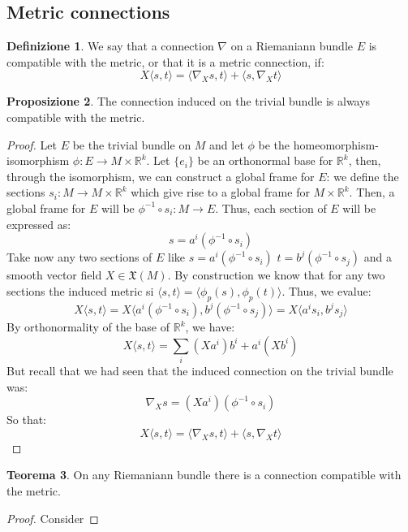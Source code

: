 \documentclass[12pt,a4paper]{report}
\theoremstyle{definition}
\newtheorem{Def}{Definizione}[chapter]
\theoremstyle{Theorem}
\newtheorem{Theo}[Def]{Teorema}
\newtheorem{Prop}[Def]{Proposizione}
\theoremstyle{definition}
\theoremstyle{definition}
\theoremstyle{definition}
\begin{document}
	\subsection{Metric connections}
	\begin{Def}
		We say that a connection $\nabla$ on a Riemaniann bundle $E$ is compatible with the metric, or that it is a metric connection, if:
		$$X\langle s,t\rangle =\langle \nabla_X s,t\rangle+\langle s,\nabla_X t\rangle$$
	\end{Def}
	\begin{Prop}
		The connection induced on the trivial bundle is always compatible with the metric.
	\end{Prop}
	\begin{proof}
		Let $E$ be the trivial bundle on $M$ and let $\phi$ be the homeomorphism-isomorphism $\phi:E\rightarrow M\times \mathbb{R}^k$.
		Let $\{e_i\}$ be an orthonormal base for $\mathbb{R}^k$, then, through the isomorphism, we can construct a global frame for $E$: we define the sections $s_i:M\rightarrow M\times \mathbb{R}^k$ which give rise to a global frame for $M\times \mathbb{R}^k$. Then, a global frame for $E$ will be $\phi^{-1}\circ s_i:M\rightarrow E$.
		Thus, each section of $E$ will be expressed as: 
		$$s=a^i(\phi^{-1}\circ s_i)$$
		Take now any two sections of $E$ like $s=a^i(\phi^{-1}\circ s_i)$ $t=b^j(\phi^{-1}\circ s_j)$ and a smooth vector field $X\in\mathfrak{X}(M)$. By construction we know that for any two sections the induced metric si $\langle s,t\rangle=\langle \phi_p(s),\phi_p(t)\rangle$. Thus, we evalue:
		$$X\langle s,t\rangle=X\langle a^i(\phi^{-1}\circ s_i),b^j(\phi^{-1}\circ s_j)\rangle =X\langle a^i s_i,b^js_j\rangle $$
		By orthonormality of the base of $\mathbb{R}^k$, we have:
		$$X\langle s,t\rangle=\sum_i (Xa^i)b^i+a^i(Xb^i)$$
		But recall that we had seen that the induced connection on the trivial bundle was: 
		$$\nabla_X s=(Xa^i)(\phi^{-1}\circ s_i)$$
		So that:
		$$X\langle s,t\rangle=\langle \nabla_Xs,t\rangle+\langle s,\nabla_Xt\rangle$$
	\end{proof}
	\begin{Theo}
		On any Riemaniann bundle there is a connection compatible with the metric.
	\end{Theo}
	\begin{proof}
		Consider
	\end{proof}
\end{document}

